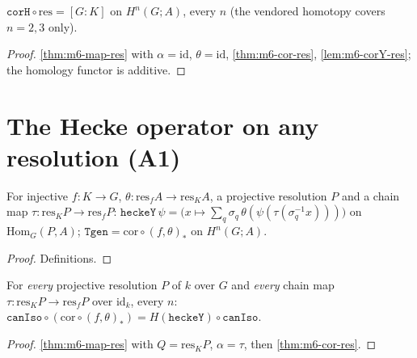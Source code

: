 \begin{theorem}[{$\mathrm{cor}\circ\mathrm{res}=[G:K]$, every degree}]\label{thm:m6-cor-res-index}
  \leanok
  $\texttt{corH}\circ\mathrm{res}=[G:K]$ on $H^n(G;A)$, every $n$ (the vendored homotopy covers $n=2,3$ only).
\end{theorem}
\begin{proof}
  \leanok
  \ref{thm:m6-map-res} with $\alpha=\mathrm{id}$, $\theta=\mathrm{id}$, \ref{thm:m6-cor-res}, \ref{lem:m6-corY-res}; the homology
  functor is additive.
\end{proof}

\section{The Hecke operator on any resolution (A1)}

\begin{definition}\label{def:m6-heckeY}
  \leanok
  For injective $f\colon K\to G$, $\theta\colon\mathrm{res}_fA\to\mathrm{res}_KA$, a projective resolution $P$ and a chain map
  $\tau\colon\mathrm{res}_KP\to\mathrm{res}_fP$: $\texttt{heckeY}\,\psi=\bigl(x\mapsto\sum_q\sigma_q\,\theta(\psi(\tau(\sigma_q^{-1}x)))\bigr)$ on
  $\mathrm{Hom}_G(P,A)$; $\texttt{Tgen}=\mathrm{cor}\circ(f,\theta)_*$ on $H^n(G;A)$.
\end{definition}
\begin{proof}
  \leanok
  Definitions.
\end{proof}

\begin{theorem}\label{thm:m6-hecke-res}
  \leanok
  For \emph{every} projective resolution $P$ of $k$ over $G$ and \emph{every} chain map $\tau\colon\mathrm{res}_KP\to\mathrm{res}_fP$ over
  $\mathrm{id}_k$, every $n$: $\texttt{canIso}\circ(\mathrm{cor}\circ(f,\theta)_*)=H(\texttt{heckeY})\circ\texttt{canIso}$.
\end{theorem}
\begin{proof}
  \leanok
  \ref{thm:m6-map-res} with $Q=\mathrm{res}_KP$, $\alpha=\tau$, then \ref{thm:m6-cor-res}.
\end{proof}

